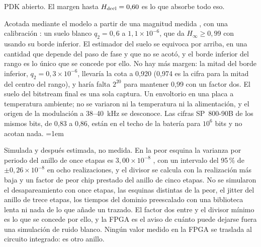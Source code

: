 \begin{description}
\ac{PDK} abierto. El margen hasta $H_{\mathrm{decl}} = 0{,}60$ es lo que absorbe todo
eso.
\item[Min-entropía en la \ac{FPGA}.] Acotada mediante el
modelo a partir de una magnitud medida \meas{}, con una calibración
\simu{}: un suelo blanco $q_2 = 0{,}6$ a $1{,}1\times10^{-6}$, que da
$H_\infty \ge 0{,}99$ con  usando su borde inferior. El estimador
del suelo se equivoca por arriba, en una cantidad que depende del paso de
fase y que no se acotó, y el borde inferior del rango es lo único que se
concede por ello. No hay más margen: la mitad del borde inferior,
$q_2 = 0{,}3\times10^{-6}$, llevaría la cota a 0,920 \est{} (0,974 es la
cifra para la mitad del centro del rango), y haría falta $2^{20}$ para
mantener 0,99 con un factor dos. El suelo del bitstream final es una
sola captura. Un
envoltorio en una placa a temperatura ambiente; no se variaron ni la
temperatura ni la alimentación, y el origen de la modulación a
38--40~kHz se desconoce. Las cifras SP~800-90B de los mismos bits, de 0,83 a
0,86, están en el techo de la batería para $10^6$ bits y no acotan nada.
\emergencystretch=1em
\item[Min-entropía en el circuito integrado.] Simulada y
después estimada, no medida. En la peor esquina la varianza por periodo
del anillo de once etapas es $3{,}00\times10^{-8}$ \simu{}, con un
intervalo del 95\,\% de $\pm0{,}26\times10^{-8}$ en ocho realizaciones, y
el divisor \est{} se calcula con la
realización más baja y un factor de peor chip prestado del anillo de
cinco etapas. No se simularon el desapareamiento con once etapas, las
esquinas distintas de la peor, el jitter del anillo de trece etapas, los
tiempos del dominio preescalado con una biblioteca lenta ni nada de lo
que añade un trazado. El factor dos entre  y el divisor mínimo
 es lo que se concede por ello, y la \ac{FPGA} es el aviso de
cuánto puede dejarse fuera una simulación de ruido blanco. Ningún valor
medido en la \ac{FPGA} se traslada al circuito integrado: es otro anillo.
\end{description}
